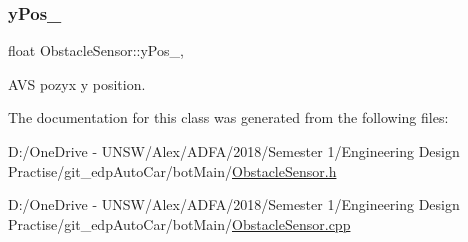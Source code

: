 \subsubsection{\texorpdfstring{y\+Pos\+\_\+}{yPos\_}}
{\footnotesize\ttfamily float Obstacle\+Sensor\+::y\+Pos\+\_\+\hspace{0.3cm}{\ttfamily [static]}, {\ttfamily [private]}}



A\+VS pozyx y position. 



The documentation for this class was generated from the following files\+:\begin{DoxyCompactItemize}
\item 
D\+:/\+One\+Drive -\/ U\+N\+S\+W/\+Alex/\+A\+D\+F\+A/2018/\+Semester 1/\+Engineering Design Practise/git\+\_\+edp\+Auto\+Car/bot\+Main/\mbox{\hyperlink{_obstacle_sensor_8h}{Obstacle\+Sensor.\+h}}\item 
D\+:/\+One\+Drive -\/ U\+N\+S\+W/\+Alex/\+A\+D\+F\+A/2018/\+Semester 1/\+Engineering Design Practise/git\+\_\+edp\+Auto\+Car/bot\+Main/\mbox{\hyperlink{_obstacle_sensor_8cpp}{Obstacle\+Sensor.\+cpp}}\end{DoxyCompactItemize}
